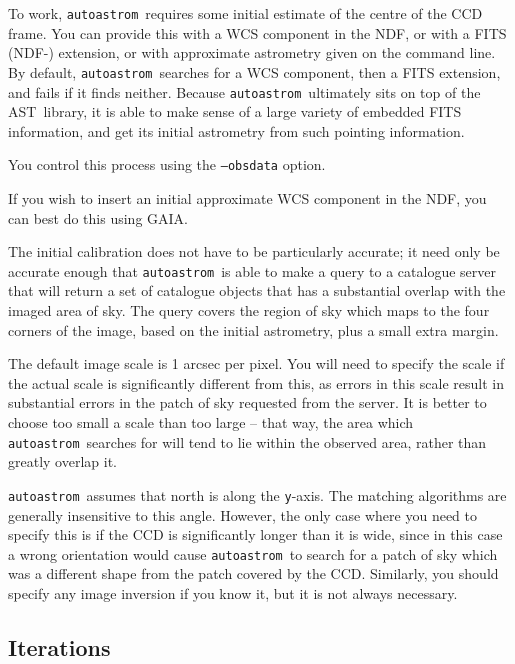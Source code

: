 \documentclass[twoside,11pt]{article}
\newcommand{\xref}[3]{#1}
\newcommand{\xlabel}[1]{}
\newcommand{\AST}{\xref{{\footnotesize AST}}{sun210}{}}
\newcommand{\autoastrom}{\texttt{autoastrom}}
\newcommand{\GAIA}{{\footnotesize GAIA}\normalsize}
\begin{document}
To work, \autoastrom\ requires some initial estimate of the centre of the CCD
frame. You can provide this with a WCS component in the NDF, or with a FITS
(NDF-) extension, or with approximate astrometry given on the command line.
By default, \autoastrom\ searches for a WCS component, then a FITS extension,
and fails if it finds neither.  Because \autoastrom\ ultimately sits on top of
the \AST\ library, it is able to make sense of a large variety of embedded
FITS information, and get its initial astrometry from such pointing
information.

  You control this process using the \texttt{--obsdata} option.
  
  If you wish to insert an initial approximate WCS component in the NDF, you
  can best do this using \GAIA.
  
  The initial calibration does not have to be particularly accurate; it need
  only be accurate enough that \autoastrom\ is able to make a query to a
  catalogue server that will return a set of catalogue objects that has a
  substantial overlap with the imaged area of sky.  The query covers the
  region of sky which maps to the four corners of the image, based on the
  initial astrometry, plus a small extra margin.
  
  The default image scale is 1 arcsec per pixel.  You will need to specify the
  scale if the actual scale is significantly different from this, as errors in
  this scale result in substantial errors in the patch of sky requested from
  the server.  It is better to choose too small a scale than too large -- that
  way, the area which \autoastrom\ searches for will tend to lie within the
  observed area, rather than greatly overlap it.
  
  \autoastrom\ assumes that north is along the \texttt{y}-axis.  The matching
  algorithms are generally insensitive to this angle.  However, the only case
  where you need to specify this is if the CCD is significantly longer than it
  is wide, since in this case a wrong orientation would cause \autoastrom\ to
  search for a patch of sky which was a different shape from the patch covered
  by the CCD.  Similarly, you should specify any image inversion if you know
  it, but it is not always necessary.

\subsection{\xlabel{sb_iterations}Iterations\label{sb:iterations}}
\end{document}
